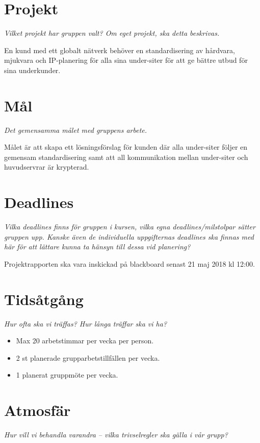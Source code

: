 
\section*{Projekt}
\textit{Vilket projekt har gruppen valt? Om eget projekt, ska detta beskrivas.}

En kund med ett globalt nätverk behöver en standardisering av hårdvara, mjukvara och IP-planering för alla sina under-siter för att ge bättre utbud för sina underkunder.

\section*{Mål}
\textit{Det gemensamma målet med gruppens arbete.}

Målet är att skapa ett lösningsförslag för kunden där alla under-siter följer en gemensam standardisering samt att all kommunikation mellan under-siter och huvudservrar är krypterad.

\section*{Deadlines}
\textit{Vilka deadlines finns för gruppen i kursen, vilka egna deadlines/milstolpar sätter gruppen upp. Kanske även de individuella uppgifternas deadlines ska finnas med här för att lättare kunna ta hänsyn till dessa vid planering?}

Projektrapporten ska vara inskickad på blackboard senast 21 maj 2018 kl 12:00.

\section*{Tidsåtgång}
\textit{Hur ofta ska vi träffas? Hur långa träffar ska vi ha?}

\begin{itemize}[noitemsep]
    \item Max 20 arbetstimmar per vecka per person.
    \item 2 st planerade grupparbetstillfällen per vecka.
    \item 1 planerat gruppmöte per vecka.
\end{itemize}

\section*{Atmosfär}
\textit{Hur vill vi behandla varandra – vilka trivselregler ska gälla i vår grupp?}

